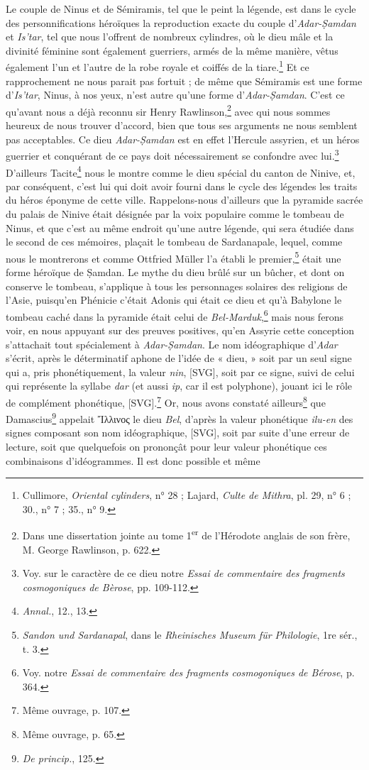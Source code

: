 \documentclass[a4paper, 11pt, oneside]{article}
\begin{document}
Le couple de Ninus et de Sémiramis, tel que le peint la légende, est dans le cycle des personnifications héroïques la reproduction exacte du couple d'\emph{Adar-\d{S}amdan} et \emph{Is'tar}, tel que nous l'offrent de nombreux cylindres, où le dieu mâle et la divinité féminine sont également guerriers, armés de la même manière, vêtus également l'un et l'autre de la robe royale et coiffés de la tiare.\footnote{Cullimore, \emph{Oriental cylinders}, n° 28 ; Lajard, \emph{Culte de Mithra}, pl. 29, n° 6 ; 30., n° 7 ; 35., n° 9.} Et ce rapprochement ne nous parait pas fortuit ; de même que Sémiramis est une forme d'\emph{Is'tar}, Ninus, à nos yeux, n'est autre qu'une forme d'\emph{Adar-\d{S}amdan}. C'est ce qu'avant nous a déjà reconnu sir Henry Rawlinson,\footnote{Dans une dissertation jointe au tome 1\textsuperscript{er} de l'Hérodote anglais de son frère, M. George Rawlinson, p. 622.} avec qui nous sommes heureux de nous trouver d'accord, bien que tous ses arguments ne nous semblent pas acceptables. Ce dieu \emph{Adar-\d{S}amdan} est en effet l'Hercule assyrien, et un héros guerrier et conquérant de ce pays doit nécessairement se confondre avec lui.\footnote{Voy. sur le caractère de ce dieu notre \emph{Essai de commentaire des fragments cosmogoniques de Bèrose}, pp. 109-112.} D'ailleurs Tacite\footnote{\emph{Annal.}, 12., 13.} nous le montre comme le dieu spécial du canton de Ninive, et, par conséquent, c'est lui qui doit avoir fourni dans le cycle des légendes les traits du héros éponyme de cette ville. Rappelons-nous d'ailleurs que la pyramide sacrée du palais de Ninive était désignée par la voix populaire comme le tombeau de Ninus, et que c'est au même endroit qu'une autre légende, qui sera étudiée dans le second de ces mémoires, plaçait le tombeau de Sardanapale, lequel, comme nous le montrerons et comme Ottfried Müller l'a établi le premier,\footnote{\emph{Sandon und Sardanapal}, dans le \emph{Rheinisches Museum für Philologie}, 1re sér., t. 3.} était une forme héroïque de \d{S}amdan. Le mythe du dieu brûlé sur un bûcher, et dont on conserve le tombeau, s'applique à tous les personnages solaires des religions de l'Asie, puisqu'en Phénicie c'était Adonis qui était ce dieu et qu'à Babylone le tombeau caché dans la pyramide était celui de \emph{Bel-Marduk},\footnote{Voy. notre \emph{Essai de commentaire des fragments cosmogoniques de Bérose}, p. 364.} mais nous ferons voir, en nous appuyant sur des preuves positives, qu'en Assyrie cette conception s'attachait tout spécialement à \emph{Adar-\d{S}amdan}. Le nom idéographique d'\emph{Adar} s'écrit, après le déterminatif aphone de l'idée de « dieu, » soit par un seul signe qui a, pris phonétiquement, la valeur \emph{nin}, [SVG], soit par ce signe, suivi de celui qui représente la syllabe \emph{dar} (et aussi \emph{ip}, car il est polyphone), jouant ici le rôle de complément phonétique, [SVG].\footnote{Même ouvrage, p. 107.} Or, nous avons constaté ailleurs\footnote{Même ouvrage, p. 65.} que Damascius\footnote{\emph{De princip.}, 125.} appelait Ἴλλινος le dieu \emph{Bel}, d'après la valeur phonétique \emph{ilu-en} des signes composant son nom idéographique, [SVG], soit par suite d'une erreur de lecture, soit que quelquefois on prononçât pour leur valeur phonétique ces combinaisons d'idéogrammes. Il est donc possible et même 
\end{document}
